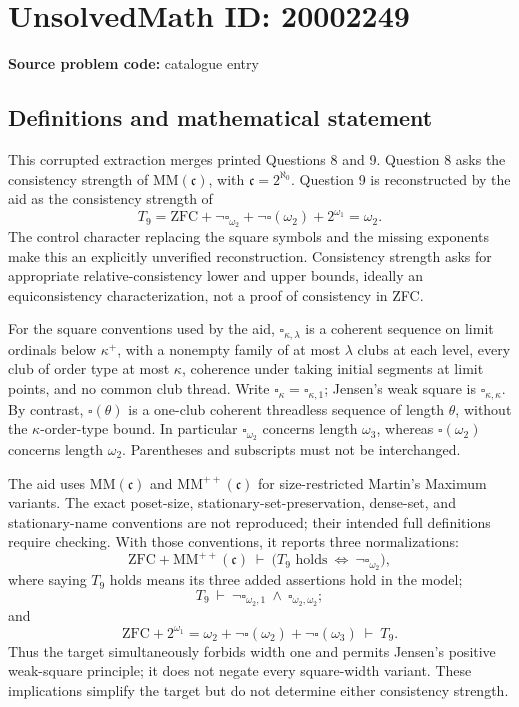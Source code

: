 \documentclass[11pt]{article}
\begin{document}
\section*{UnsolvedMath ID: 20002249}
\textbf{Source problem code:} catalogue entry
\subsection{Definitions and mathematical statement}
This corrupted extraction merges printed Questions 8 and 9. Question 8 asks the consistency strength of \(\mathrm{MM}(\mathfrak c)\), with \(\mathfrak c=2^{\aleph_0}\). Question 9 is reconstructed by the aid as the consistency strength of
\[
 T_9=\mathrm{ZFC}+\neg\square_{\omega_2}
       +\neg\square(\omega_2)+2^{\omega_1}=\omega_2.
\]
The control character replacing the square symbols and the missing exponents make this an explicitly unverified reconstruction. Consistency strength asks for appropriate relative-consistency lower and upper bounds, ideally an equiconsistency characterization, not a proof of consistency in ZFC.

For the square conventions used by the aid, \(\square_{\kappa,\lambda}\) is a coherent sequence on limit ordinals below \(\kappa^+\), with a nonempty family of at most \(\lambda\) clubs at each level, every club of order type at most \(\kappa\), coherence under taking initial segments at limit points, and no common club thread. Write \(\square_\kappa=\square_{\kappa,1}\); Jensen's weak square is \(\square_{\kappa,\kappa}\). By contrast, \(\square(\theta)\) is a one-club coherent threadless sequence of length \(\theta\), without the \(\kappa\)-order-type bound. In particular \(\square_{\omega_2}\) concerns length \(\omega_3\), whereas \(\square(\omega_2)\) concerns length \(\omega_2\). Parentheses and subscripts must not be interchanged.

The aid uses \(\mathrm{MM}(\mathfrak c)\) and \(\mathrm{MM}^{++}(\mathfrak c)\) for size-restricted Martin's Maximum variants. The exact poset-size, stationary-set-preservation, dense-set, and stationary-name conventions are not reproduced; their intended full definitions require checking. With those conventions, it reports three normalizations:
\[
 \mathrm{ZFC}+\mathrm{MM}^{++}(\mathfrak c)\ \vdash\
 \bigl(T_9\text{ holds}\ \Longleftrightarrow\ \neg\square_{\omega_2}\bigr),
\]
where saying \(T_9\) holds means its three added assertions hold in the model;
\[
 T_9\ \vdash\ \neg\square_{\omega_2,1}
                 \ \wedge\ \square_{\omega_2,\omega_2};
\]
and
\[
 \mathrm{ZFC}+2^{\omega_1}=\omega_2
   +\neg\square(\omega_2)+\neg\square(\omega_3)
 \ \vdash\ T_9.
\]
Thus the target simultaneously forbids width one and permits Jensen's positive weak-square principle; it does not negate every square-width variant. These implications simplify the target but do not determine either consistency strength.
\end{document}
